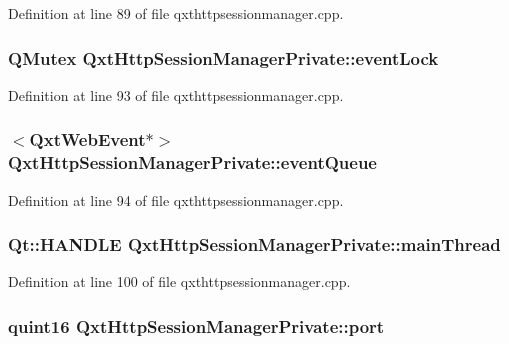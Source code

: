 Definition at line 89 of file qxthttpsessionmanager.\-cpp.

\hypertarget{class_qxt_http_session_manager_private_a64f900c3f04fc7a73a9f3fe5d5c0727d}{
\subsubsection[{event\-Lock}]{\setlength{\rightskip}{0pt plus 5cm}Q\-Mutex Qxt\-Http\-Session\-Manager\-Private\-::event\-Lock}}\label{class_qxt_http_session_manager_private_a64f900c3f04fc7a73a9f3fe5d5c0727d}


Definition at line 93 of file qxthttpsessionmanager.\-cpp.

\hypertarget{class_qxt_http_session_manager_private_a7fce9c9c9e2fe2f22dc3bfa1fac4425d}{
\subsubsection[{event\-Queue}]{$<${\bf Qxt\-Web\-Event}$\ast$$>$ Qxt\-Http\-Session\-Manager\-Private\-::event\-Queue}}\label{class_qxt_http_session_manager_private_a7fce9c9c9e2fe2f22dc3bfa1fac4425d}


Definition at line 94 of file qxthttpsessionmanager.\-cpp.

\hypertarget{class_qxt_http_session_manager_private_a6779e8abdff2f0531a087d41b59f6b94}{
\subsubsection[{main\-Thread}]{\setlength{\rightskip}{0pt plus 5cm}Qt\-::\-H\-A\-N\-D\-L\-E Qxt\-Http\-Session\-Manager\-Private\-::main\-Thread}}\label{class_qxt_http_session_manager_private_a6779e8abdff2f0531a087d41b59f6b94}


Definition at line 100 of file qxthttpsessionmanager.\-cpp.

\hypertarget{class_qxt_http_session_manager_private_afaed4122891eaeae95a49b4c06194a71}{
\subsubsection[{port}]{\setlength{\rightskip}{0pt plus 5cm}quint16 Qxt\-Http\-Session\-Manager\-Private\-::port}}\label{class_qxt_http_session_manager_private_afaed4122891eaeae95a49b4c06194a71}


